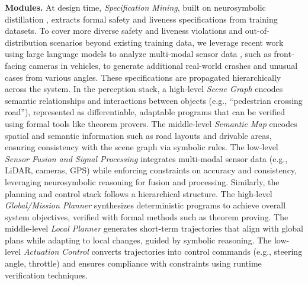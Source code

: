 \textbf{Modules.} 
At design time, \textit{Specification Mining}, built on neurosymbolic distillation \cite{singireddy2023automaton,blazek2024automated,abir2024neuro}, extracts formal safety and liveness specifications from training datasets.
To cover more diverse safety and liveness violations and out-of-distribution scenarios beyond existing training data, we leverage recent work using large language models to analyze multi-modal sensor data \cite{zheng2024testing,deng2023target}, such as front-facing cameras in vehicles, to generate additional real-world crashes and unusual cases from various angles.
These specifications are propagated hierarchically across the system. In the perception stack, a high-level \textit{Scene Graph} encodes semantic relationships and interactions between objects (e.g., ``pedestrian crossing road''), represented as differentiable, adaptable programs that can be verified using formal tools like theorem provers. The middle-level \textit{Semantic Map} encodes spatial and semantic information such as road layouts and drivable areas, ensuring consistency with the scene graph via symbolic rules. The low-level \textit{Sensor Fusion and Signal Processing} integrates multi-modal sensor data (e.g., LiDAR, cameras, GPS) while enforcing constraints on accuracy and consistency, leveraging neurosymbolic reasoning for fusion and processing. Similarly, the planning and control stack follows a hierarchical structure. The high-level \textit{Global/Mission Planner} synthesizes deterministic programs to achieve overall system objectives, verified with formal methods such as theorem proving. The middle-level \textit{Local Planner} generates short-term trajectories that align with global plans while adapting to local changes, guided by symbolic reasoning. The low-level \textit{Actuation Control} converts trajectories into control commands (e.g., steering angle, throttle) and ensures compliance with constraints using runtime verification techniques.

